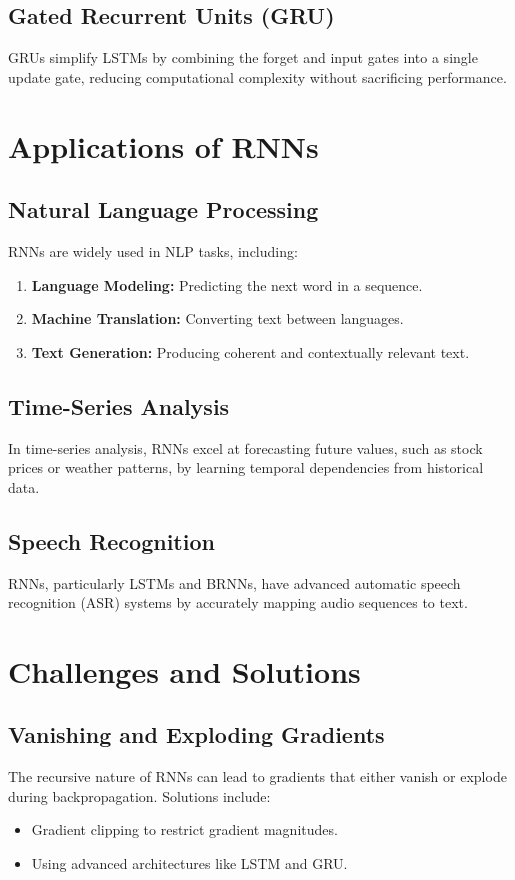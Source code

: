 \subsection{Gated Recurrent Units (GRU)}
GRUs simplify LSTMs by combining the forget and input gates into a single update gate, reducing computational complexity without sacrificing performance.

\section{Applications of RNNs}
\subsection{Natural Language Processing}
RNNs are widely used in NLP tasks, including:
\begin{enumerate}
    \item \textbf{Language Modeling:} Predicting the next word in a sequence.
    \item \textbf{Machine Translation:} Converting text between languages.
    \item \textbf{Text Generation:} Producing coherent and contextually relevant text.
\end{enumerate}

\subsection{Time-Series Analysis}
In time-series analysis, RNNs excel at forecasting future values, such as stock prices or weather patterns, by learning temporal dependencies from historical data.

\subsection{Speech Recognition}
RNNs, particularly LSTMs and BRNNs, have advanced automatic speech recognition (ASR) systems by accurately mapping audio sequences to text.

\section{Challenges and Solutions}
\subsection{Vanishing and Exploding Gradients}
The recursive nature of RNNs can lead to gradients that either vanish or explode during backpropagation. Solutions include:
\begin{itemize}
    \item Gradient clipping to restrict gradient magnitudes.
    \item Using advanced architectures like LSTM and GRU.
\end{itemize}


